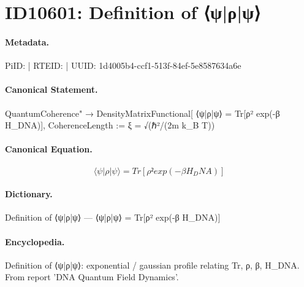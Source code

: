 \section*{ID10601: Definition of ⟨ψ|ρ|ψ⟩}
\paragraph{Metadata.}
PiID:  | RTEID:  | UUID: 1d4005b4-ccf1-513f-84ef-5e8587634a6e

\paragraph{Canonical Statement.}
QuantumCoherence" → DensityMatrixFunctional[ ⟨ψ|ρ|ψ⟩ = Tr[ρ² exp(-β H\_DNA)], CoherenceLength := ξ = √(ℏ²/(2m k\_B T))

\paragraph{Canonical Equation.}
\[
⟨ψ|ρ|ψ⟩ = Tr[ρ² exp(-β H_DNA)]
\]

\paragraph{Dictionary.}
Definition of ⟨ψ|ρ|ψ⟩ — ⟨ψ|ρ|ψ⟩ = Tr[ρ² exp(-β H\_DNA)]

\paragraph{Encyclopedia.}
Definition of ⟨ψ|ρ|ψ⟩: exponential / gaussian profile relating Tr, ρ, β, H\_DNA. From report 'DNA Quantum Field Dynamics'.
